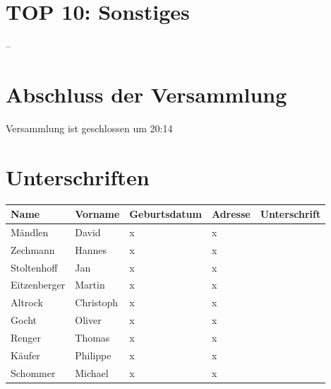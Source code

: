 \documentclass[a4paper]{scrartcl}
\begin{document}
\clearpage

\section{TOP 10: Sonstiges}

--

\section{Abschluss der Versammlung}
Versammlung ist geschlossen um 20:14

\clearpage

\section{Unterschriften}

\begin{table}[h]
\begin{tabularx}{\textwidth}{XXXXX}
Name & Vorname & Geburtsdatum & Adresse & Unterschrift\\
\toprule
Mändlen & David& x &x\\
Zechmann&Hannes&x&x\\
Stoltenhoff&Jan&x&x\\
Eitzenberger&Martin&x&x\\
Altrock&Christoph&x&x\\
Gocht&Oliver&x&x\\
Renger&Thomas&x&x\\
Käufer&Philippe&x&x\\
Schommer&Michael&x&x\\
\end{tabularx}
\end{table}
\end{document}
